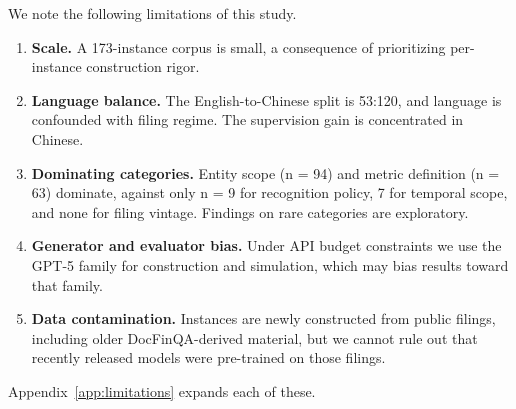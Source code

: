 We note the following limitations of this study.
\begin{enumerate}[leftmargin=*,itemsep=1pt,topsep=3pt]
  \item \textbf{Scale.} A 173-instance corpus is small, a consequence of prioritizing per-instance construction rigor.
  \item \textbf{Language balance.} The English-to-Chinese split is 53:120, and language is confounded with filing regime. The supervision gain is concentrated in Chinese.
  \item \textbf{Dominating categories.} Entity scope (n = 94) and metric definition (n = 63) dominate, against only n = 9 for recognition policy, 7 for temporal scope, and none for filing vintage. Findings on rare categories are exploratory.
  \item \textbf{Generator and evaluator bias.} Under API budget constraints we use the GPT-5 family for construction and simulation, which may bias results toward that family.
  \item \textbf{Data contamination.} Instances are newly constructed from public filings, including older DocFinQA-derived material, but we cannot rule out that recently released models were pre-trained on those filings.
\end{enumerate}
Appendix~\ref{app:limitations} expands each of these.
